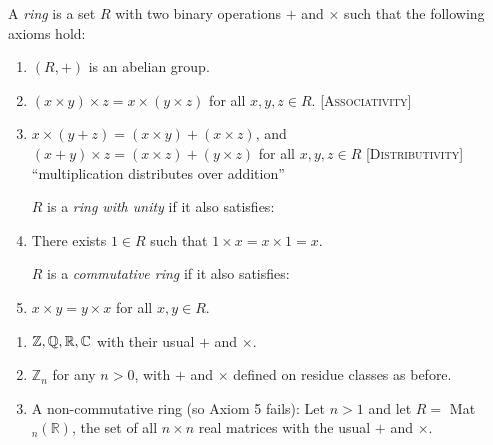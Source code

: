 \documentclass[twoside]{scrartcl}
\begin{document}
\begin{definition} A \emph{ring} is a set $R$ with two binary operations $+$ and $\times$ such that the following axioms hold:
 \begin{enumerate}
 \item $(R,+)$ is an abelian group.
 \item $(x \times y)\times z = x \times (y \times z)$ for all $x,y,z \in R$. \textsc{[Associativity]}
 \item $x \times (y + z) = (x \times y) + (x \times z)$, and $(x + y) \times z = (x \times z) + (y \times z)$ for all $x,y,z \in R$ \textsc{[Distributivity]} ``multiplication distributes over addition''\\ \vspace*{-10pt}
 
 $R$ is a \emph{ring with unity} if it also satisfies:\\  \vspace*{-12pt}

 \item  There exists $1 \in R$ such that $1 \times x = x \times 1 = x$. \\ \vspace*{-10pt}

$R$ is a \emph{commutative ring} if it also satisfies:\\ \vspace*{-12pt}
\item $x \times y = y \times x$ for all $x,y \in R$.\\ \vspace*{-10pt}

 \end{enumerate}
 \end{definition}\vspace*{10pt}
 
\begin{examples} \begin{enumerate}
 \item $\mathbb{Z}, \mathbb{Q}, \mathbb{R}, \mathbb{C}$ with their usual $+$ and $\times$.
 \item $\mathbb{Z}_n$ for any $n > 0$, with $+$ and $\times$ defined on residue classes as before.
 \item A non-commutative ring (so Axiom 5 fails): Let $n >1$ and let $R =$ Mat$_n(\mathbb{R})$, the set of all $n \times n$ real matrices with the usual $+$ and $\times$.	
 \end{enumerate}
 \end{examples}\vspace*{10pt}
 
\end{document}
